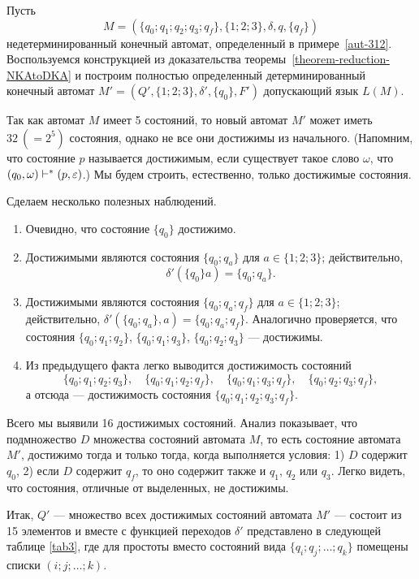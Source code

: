 \begin{myexample}
\label{example-NKAtoDKA-321}
Пусть
\[
M=(\{q_0;q_1;q_2;q_3;q_f\},\{1;2;3\},\delta,q,\{q_f\})
\]
недетерминированный конечный автомат, определенный в примере~\ref{aut-312}. Воспользуемся конструкцией из доказательства теоремы~\ref{theorem-reduction-NKAtoDKA} и построим полностью определенный детерминированный конечный автомат $M'=(Q',\{1;2;3\},\delta',\{q_0\},F')$ допускающий язык $L(M)$.

Так как автомат $M$ имеет 5 состояний, то новый автомат $M'$ может иметь $32~(=2^5)$ состояния, однако не все они достижимы из начального. (Напомним, что состояние $p$ называется достижимым, если существует такое слово $\omega$, что $(q_0,\omega)\vdash^*(p,\varepsilon)$.) Мы будем строить, естественно, только достижимые состояния.

Сделаем несколько полезных наблюдений.
\begin{enumerate}
    \item Очевидно, что состояние $\{q_0\}$ достижимо.

    \item Достижимыми являются состояния $\{q_0;q_a\}$ для
    $a\in \{1;2;3\}$; действительно,
    \[
        \delta'(\{q_0\}a)=\{q_0;q_a\}.
    \]

    \item Достижимыми являются состояния $\{q_0;q_a;q_f\}$ для $a\in\{1;2;3\}$; действительно, $\delta'(\{q_0;q_a\},a)=\{q_0;q_a;q_f\}$. Аналогично проверяется, что состояния $\{q_0;q_1;q_2\}$, $\{q_0;q_1;q_3\}$, $\{q_0;q_2;q_3\}$ --- достижимы.

    \item Из предыдущего факта легко выводится достижимость состояний
    \[
        \{q_0;q_1;q_2;q_3\}, \quad \{q_0;q_1;q_2;q_f\}, \quad
        \{q_0;q_1;q_3;q_f\}, \quad \{q_0;q_2;q_3;q_f\},
    \]
    а отсюда --- достижимость состояния $\{q_0;q_1;q_2;q_3;q_f\}$.
\end{enumerate}

Всего мы выявили 16 достижимых состояний. Анализ показывает, что подмножество $D$ множества состояний автомата $M$, то есть состояние автомата $M'$, достижимо тогда и только тогда, когда выполняется условия: 1) $D$ содержит $q_0$, 2) если $D$ содержит $q_f$, то оно содержит также и $q_1$, $q_2$ или $q_3$. Легко видеть, что состояния, отличные от выделенных, не достижимы.

Итак, $Q'$ --- множество всех достижимых состояний автомата $M'$ --- состоит из 15 элементов и вместе с функцией переходов $\delta'$ представлено в следующей таблице \ref{tab3}, где для простоты вместо состояний вида $\{q_i;q_j;\ldots ;q_k\}$ помещены списки $(i;j;\ldots ;k)$.


\end{myexample}
